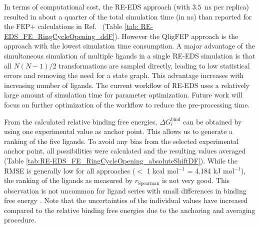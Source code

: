 In terms of computational cost, the RE-EDS approach (with $3.5$~ns per replica) resulted in about a quarter of the total simulation time (in ns) than reported for the FEP+ calculations in Ref.~\cite{Wang2017} (Table \ref{tab: RE-EDS_FE_RingCycleOpening_ddF}). However the QligFEP approach is the approach with the lowest simulation time consumption. A major advantage of the simultaneous simulation of multiple ligands in a single RE-EDS simulation is that all $N(N-1)/2$ transformations are sampled directly, leading to low statistical errors and removing the need for a state graph. This advantage increases with increasing number of ligands. The current workflow of RE-EDS uses a relatively large amount of simulation time for parameter optimization. Future work will focus on further optimization of the workflow to reduce the pre-processing time. 

From the calculated relative binding free energies, $\Delta G_{i}^{\text{bind}}$ can be obtained by using one experimental value as anchor point. This allows us to generate a ranking of the five ligands. To avoid any bias from the selected experimental anchor point, all possibilities were calculated and the resulting values averaged (Table \ref{tab:RE-EDS_FE_RingCycleOpening_absoluteShiftDF}). While the RMSE is generally low for all approaches ($<$ 1 kcal mol$^{-1}$ = 4.184 kJ mol$^{-1}$), the ranking of the ligands as measured by $r_{\text{Spearman}}$ is not very good. 
This observation is not uncommon for ligand series with small differences in binding free energy \cite{Wang2015,Schindler2020}.
Note that the uncertainties of the individual values have increased compared to the relative binding free energies due to the anchoring and averaging procedure.


